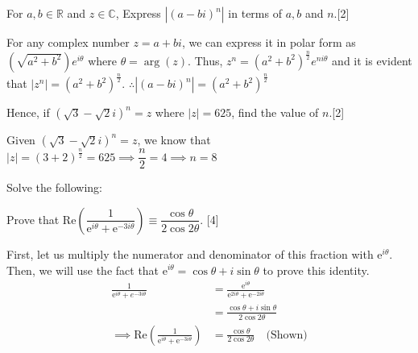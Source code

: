 \documentclass[12pt, a4 paper]{article}
\begin{document}
\begin{outline}[enumerate]
	\2 For $a,b \in \mathbb{R}$ and $z \in \mathbb{C}$, %
	\3 Express $|(a-bi)^n|$ in terms of $a,b$ and $n$.\hfill[2]
	\begin{answer}
		For any complex number $z=a+bi$, we can express it in polar form as $(\sqrt{a^2+b^2})e^{i\theta}$ where $\theta=\arg{(z)}$. Thus, $z^n=(a^2+b^2)^\frac{n}{2}e^{ni\theta}$ and it is evident that $|z^n| =(a^2+b^2)^\frac{n}{2}$. $\therefore |(a-bi)^n|=(a^2+b^2)^\frac{n}{2}$
	\end{answer}
	\3 Hence, if $(\sqrt{3}-\sqrt{2}i)^n=z$ where $|z|=625$, find the value of $n$.\hfill[2]
	\begin{answer}
		Given $(\sqrt{3}-\sqrt{2}i)^n=z$, we know that $|z|=(3+2)^\frac{n}{2}=625 \implies \dfrac{n}{2}=4 \implies n=8$
	\end{answer}

	\1 Solve the following: %

	\2 Prove that Re$(\dfrac{1}{\mathrm{e}^{i\theta}+\mathrm{e}^{-3i\theta}}) \equiv \dfrac{\cos{\theta}}{2\cos{2\theta}}$. \hfill[4] %
	\begin{answer}
		First, let us multiply the numerator and denominator of this fraction with $\mathrm{e}^{i\theta}$. Then, we will use the fact that $\mathrm{e}^{i\theta}=\cos\theta+i\sin\theta$ to prove this identity.
		\begin{align*}
			\frac{1}{\mathrm{e}^{i\theta}+e^{-3i\theta}}                                & = \frac{\mathrm{\mathrm{e}}^{i\theta}}{\mathrm{e}^{2i\theta}+\mathrm{e}^{-2i\theta}} \\
			                                                                            & = \frac{\cos\theta+i\sin\theta}{2\cos2\theta}                                        \\
			\implies \textrm{Re}(\frac{1}{\mathrm{e}^{i\theta}+\mathrm{e}^{-3i\theta}}) & =\frac{\cos{\theta}}{2\cos{2\theta}}\quad\textrm{(Shown)}
		\end{align*}
	\end{answer}


\end{outline}
\end{document}
